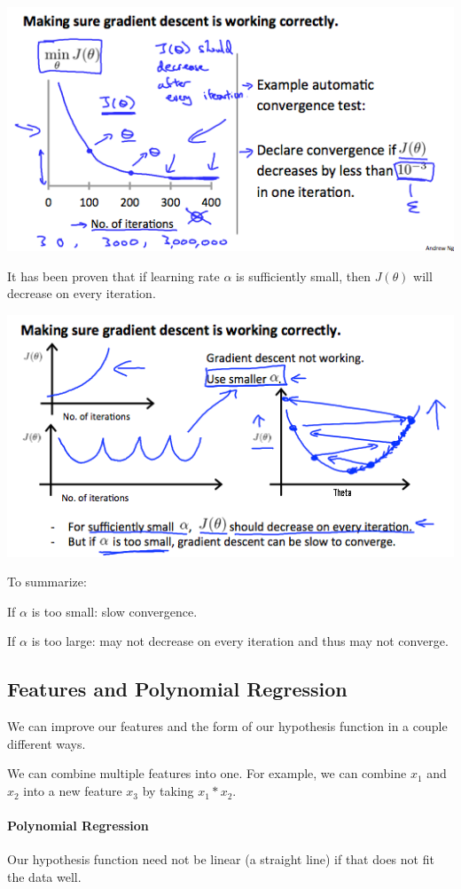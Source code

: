 \documentclass[UTF8]{article}
\begin{document}
\includegraphics[width = .8\textwidth]{NotePics/4_2_2_1.png}

It has been proven that if learning rate $\alpha$ is sufficiently small, then $J(\theta)$ will decrease on every iteration.

\includegraphics[width = .8\textwidth]{NotePics/4_2_2_2.png}

To summarize:

If $\alpha$ is too small: slow convergence.

If $\alpha$ is too large: may not decrease on every iteration and thus may not converge.

\subsection{Features and Polynomial Regression}

We can improve our features and the form of our hypothesis function in a couple different ways.

We can combine multiple features into one. For example, we can combine $x_1$ and $x_2$ into a new feature $x_3$ by taking $x_1*x_2$.

\paragraph{Polynomial Regression}

Our hypothesis function need not be linear (a straight line) if that does not fit the data well.
\end{document}
